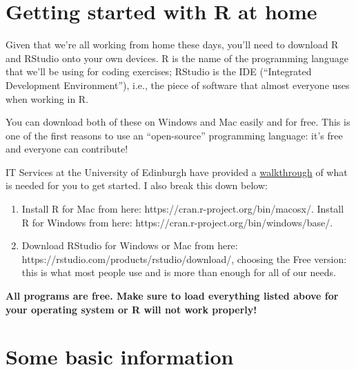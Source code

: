 \documentclass[
  letterpaper,
  DIV=11,
  numbers=noendperiod]{scrreprt}
\begin{document}
\hypertarget{getting-started-with-r-at-home}{%
\section*{Getting started with R at
home}\label{getting-started-with-r-at-home}}

Given that we're all working from home these days, you'll need to
download R and RStudio onto your own devices. R is the name of the
programming language that we'll be using for coding exercises; RStudio
is the IDE (``Integrated Development Environment''), i.e., the piece of
software that almost everyone uses when working in R.

You can download both of these on Windows and Mac easily and for free.
This is one of the first reasons to use an ``open-source'' programming
language: it's free and everyone can contribute!

IT Services at the University of Edinburgh have provided a
\href{https://uoe.sharepoint.com/sites/hss/sps/itservices/SPSShareSpaceManagement/Moblabdoc/SitePages/Computational-Text-Analysis.aspx?cid=59b29656-3df8-4c19-9423-24765076e742}{walkthrough}
of what is needed for you to get started. I also break this down below:

\begin{enumerate}
\def\labelenumi{\arabic{enumi}.}
\item
  Install R for Mac from here: https://cran.r-project.org/bin/macosx/.
  Install R for Windows from here:
  https://cran.r-project.org/bin/windows/base/.
\item
  Download RStudio for Windows or Mac from here:
  https://rstudio.com/products/rstudio/download/, choosing the Free
  version: this is what most people use and is more than enough for all
  of our needs.
\end{enumerate}

\textbf{All programs are free. Make sure to load everything listed above
for your operating system or R will not work properly!}

\hypertarget{some-basic-information}{%
\section*{Some basic information}\label{some-basic-information}}
\end{document}
